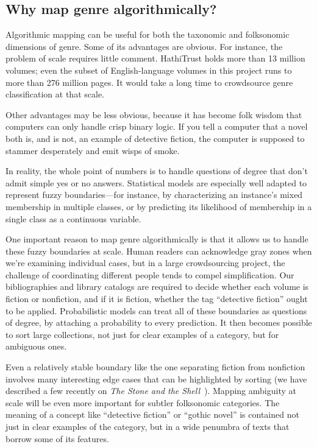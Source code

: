 \documentclass[paper=a4, fontsize=12pt]{scrartcl}
\numberwithin{equation}{section}		%
\numberwithin{figure}{section}			%
\numberwithin{table}{section}				%
\begin{document}
\subsection{Why map genre algorithmically?}

Algorithmic mapping can be useful for both the taxonomic and folksonomic dimensions of genre. Some of its advantages are obvious. For instance, the problem of scale requires little comment. HathiTrust holds more than 13 million volumes; even the subset of English-language volumes in this project runs to more than 276 million pages. It would take a long time to crowdsource genre classification at that scale.

Other advantages may be less obvious, because it has become folk wisdom that computers can only handle crisp binary logic. If you tell a computer that a novel both is, and is not, an example of detective fiction, the computer is supposed to stammer desperately and emit wisps of smoke.

In reality, the whole point of numbers is to handle questions of degree that don't admit simple yes or no answers. Statistical models are especially well adapted to represent fuzzy boundaries---for instance, by characterizing an instance's mixed membership in multiple classes, or by predicting its likelihood of membership in a single class as a continuous variable.

One important reason to map genre algorithmically is that it allows us to handle these fuzzy boundaries at scale. Human readers can acknowledge gray zones when we're examining individual cases, but in a large crowdsourcing project, the challenge of coordinating different people tends to compel simplification. Our bibliographies and library catalogs are required to decide whether each volume is fiction or nonfiction, and if it is fiction, whether the tag ``detective fiction'' ought to be applied. Probabilistic models can treat all of these boundaries as questions of degree, by attaching a probability to every prediction. It then becomes possible to sort large collections, not just for clear examples of a category, but for ambiguous ones. 

Even a relatively stable boundary like the one separating fiction from nonfiction involves many interesting edge cases that can be highlighted by sorting (we have described a few recently on \textit{The Stone and the Shell}~\cite{underwood:blurry}). Mapping ambiguity at scale will be even more important for subtler folksonomic categories. The meaning of a concept like ``detective fiction'' or ``gothic novel'' is contained not just in clear examples of the category, but in a wide penumbra of texts that borrow some of its features. 
\end{document}
